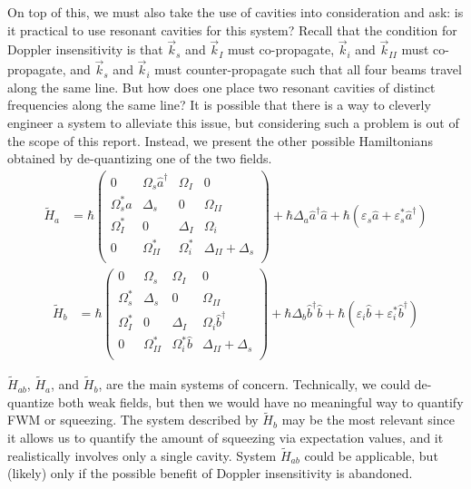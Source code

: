 \documentclass[aps,pra,showpacs,amsmath,amssymb,nofootinbib,longbibliography,superscriptaddress
]{revtex4-1}
\theoremstyle{definition}
\theoremstyle{remark}
\newcommand{\0}{\hat{0}}
\begin{document}
On top of this, we must also take the use of cavities into consideration and ask: is it practical to use resonant cavities for this system? Recall that the condition for Doppler insensitivity is that $\vec{k}_s$ and $\vec{k}_I$ must co-propagate, $\vec{k}_i$ and $\vec{k}_{II}$ must co-propagate, and $\vec{k}_s$ and $\vec{k}_i$ must counter-propagate such that all four beams travel along the same line. But how does one place two resonant cavities of distinct frequencies along the same line? It is possible that there is a way to cleverly engineer a system to alleviate this issue, but considering such a problem is out of the scope of this report. Instead, we present the other possible Hamiltonians obtained by de-quantizing one of the two fields.
\begin{align}\label{Ha}
    \tilde{H}_{a}
    &=
    \hbar \left(
        \begin{array}{cccc}
            0 & \Omega_{s} \hat{a}^{\dagger} & \Omega_{I} & 0\\
            \Omega_{s}^* \hat{a} & \Delta_s & 0 & \Omega_{II}\\
            \Omega_{I}^* & 0 & \Delta_I & \Omega_{i} \\
            0 & \Omega_{II}^* & \Omega_{i}^* & \Delta_{II} + \Delta_s\\
        \end{array}
    \right) +
    \hbar \Delta_a \hat{a}^{\dagger}\hat{a} +
    \hbar\left(\varepsilon_s \hat{a} + \varepsilon_s^* \hat{a}^{\dagger}\right)
\end{align}
\begin{align}\label{Hb}
    \tilde{H}_{b}
    &=
    \hbar\left(
        \begin{array}{cccc}
            0 & \Omega_{s} & \Omega_{I} & 0\\
            \Omega_{s}^* & \Delta_s & 0 & \Omega_{II}\\
            \Omega_{I}^* & 0 & \Delta_I & \Omega_{i} \hat{b}^{\dagger}\\
            0 & \Omega_{II}^* & \Omega_{i}^* \hat{b} & \Delta_{II} + \Delta_s\\
        \end{array}
    \right) +
    \hbar \Delta_b  \hat{b}^{\dagger}\hat{b} +
    \hbar \left(\varepsilon_i \hat{b} + \varepsilon_i^* \hat{b}^{\dagger}\right)
\end{align}

$\tilde{H}_{ab}$, $\tilde{H}_{a}$, and $\tilde{H}_{b}$, are the main systems of concern. Technically, we could de-quantize both weak fields, but then we would have no meaningful way to quantify FWM or squeezing. The system described by $\tilde{H}_{b}$ may be the most relevant since it allows us to quantify the amount of squeezing via expectation values, and it realistically involves only a single cavity. System $\tilde{H}_{ab}$ could be applicable, but (likely) only if the possible benefit of Doppler insensitivity is abandoned.
\end{document}

